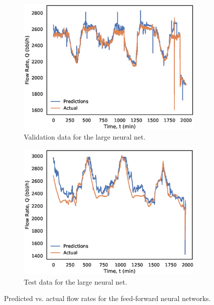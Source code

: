 \begin{figure}[p]
\begin{subfigure}[b]{0.48\textwidth}
         \includegraphics[width=\textwidth]{images/suncor/08largenn_valid.eps}
         \caption{Validation data for the large neural net.}
         \label{fig:08largenn_valid}
     \end{subfigure}
     \begin{subfigure}[b]{0.48\textwidth}
         \includegraphics[width=\textwidth]{images/suncor/08largenn_test.eps}
         \caption{Test data for the large neural net.}
         \label{fig:08largenn_test}
     \end{subfigure}
        \caption{Predicted vs. actual flow rates for the feed-forward neural networks.}
        \label{fig:08PolynomialPlots}
\end{figure}

